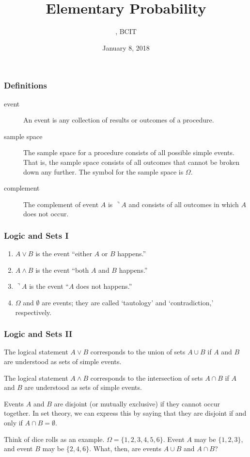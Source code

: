 \documentclass[xcolor=dvipsnames]{beamer}
\title{Elementary Probability}
\subtitle{{\CourseNumber}, BCIT}
\author{\CourseName}
\date{January 8, 2018}
\begin{document}
\begin{frame}
  \titlepage
\end{frame}

\begin{frame}
  \frametitle{Definitions}
  \begin{description}
  \item[event] An event is any collection of results or outcomes of a
    procedure.
  \item[sample space] The sample space for a procedure consists of all
    possible simple events. That is, the sample space consists of all
    outcomes that cannot be broken down any further. The symbol for
    the sample space is $\Omega$. 
  \item[complement] The complement of event $A$ is $\urcorner{}A$ and
    consists of all outcomes in which $A$ does not occur.
  \end{description}
\end{frame}

\begin{frame}
  \frametitle{Logic and Sets I}
  \begin{enumerate}
  \item<1-> $A\vee{}B$ is the event ``either $A$ or $B$ happens.''
  \item<2-> $A\wedge{}B$ is the event ``both $A$ and $B$ happens.''
  \item<3-> $\urcorner{}A$ is the event ``$A$ does not happens.''
  \item<4-> $\Omega$ and $\emptyset$ are events; they are called
    `tautology' and `contradiction,' respectively.
  \end{enumerate}
\end{frame}

\begin{frame}
  \frametitle{Logic and Sets II}
  The logical statement $A\vee{}B$ corresponds to the union of sets
  $A\cup{}B$ if $A$ and $B$ are understood as sets of simple events.

\medskip

  The logical statement $A\wedge{}B$ corresponds to the intersection of sets
  $A\cap{}B$ if $A$ and $B$ are understood as sets of simple events.

\medskip

Events $A$ and $B$ are \alert{disjoint} (or \alert{mutually
  exclusive}) if they cannot occur together. In set theory, we can
express this by saying that they are disjoint if and only if
$A\cap{}B=\emptyset$.

Think of dice rolls as an example. $\Omega=\{1,2,3,4,5,6\}$. Event $A$
may be $\{1,2,3\}$, and event $B$ may be $\{2,4,6\}$. What, then, are
events $A\cup{}B$ and $A\cap{}B$?
\end{frame}
\end{document}
